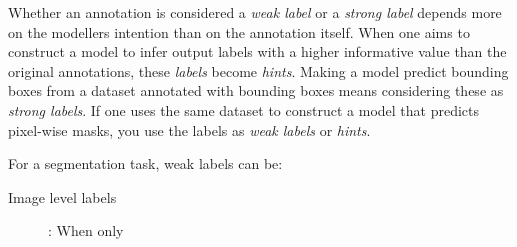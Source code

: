 Whether an annotation is considered a \textit{weak label} or a \textit{strong label} depends more on the modellers intention than on the annotation itself. 
When one aims to construct a model to infer output labels with a higher informative value than the original annotations, these \textit{labels} become \textit{hints}.
Making a model predict bounding boxes from a dataset annotated with bounding boxes means considering these as \textit{strong labels}. 
If one uses the same dataset to construct a model that predicts pixel-wise masks, you use the labels as \textit{weak labels} or \textit{hints}.

For a segmentation task, weak labels can be:
\begin{description}
    \item[Image level labels]: When only  
\end{description}

